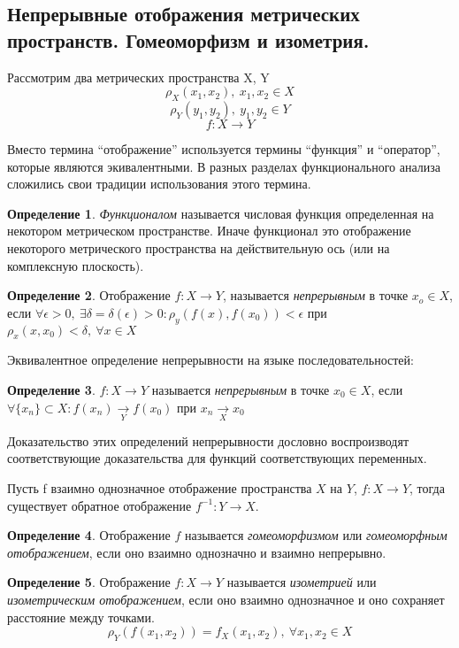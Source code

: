 \documentclass[14pt,a4paper]{extarticle}
\theoremstyle{definition}
\newtheorem{definition}{Определение}[section]
\theoremstyle{remark}
\renewcommand{\[}{\begin{dmath*}[compact]}
\renewcommand{\]}{\end{dmath*}}
\newcommand{\sep}{ , \ \allowbreak }
\begin{document}
\subsection{Непрерывные отображения метрических пространств.
Гомеоморфизм и изометрия.}

Рассмотрим два метрических пространства X, Y
\[\rho_X(x_1,x_2)\sep x_1,x_2\in X \]
\[\rho_Y(y_1, y_2)\sep y_1,y_2\in Y \]
\[ {f: X \to Y}\]

Вместо термина ``отображение'' используется термины ``функция'' и
``оператор'', которые являются экивалентными.
В разных разделах функционального анализа сложились свои традиции
использования этого термина.

\begin{definition}
  \textit{Функционалом} называется числовая функция определенная на
  некотором метрическом пространстве.
  Иначе функционал это отображение некоторого метрического
  пространства на действительную ось (или на комплексную плоскость).
\end{definition}

\begin{definition}
  Отображение $f: X \to Y$, называется \textit{непрерывным} в точке $x_o \in X$,
  если $ \forall \epsilon > 0 \sep \exists \delta = \delta (\epsilon) > 0:
  \rho_y(f(x), f(x_0)) < \epsilon$ при $\rho_x(x,x_0)<\delta \sep
  \forall x \in X$
\end{definition}

Эквивалентное определение непрерывности на языке последовательностей:
\begin{definition}
  $f: X \to Y$ называется \textit{непрерывным} в точке $x_0 \in X$, если
  $\forall \{x_n\}\subset X: f(x_n) \xrightarrow[Y]{} f(x_0)$
  при $x_n\xrightarrow[X]{} x_0$
\end{definition}

Доказательство этих определений непрерывности дословно воспроизводят
соответствующие доказательства для функций соответствующих переменных.

Пусть f взаимно однозначное отображение пространства $X$ на $Y$,
$f: X \to Y$, тогда существует обратное отображение
$f^{-1}: Y\to X$.

\begin{definition}
  Отображение $f$ называется \textit{гомеоморфизмом} или
  \textit{гомеоморфным отображением},
  если оно взаимно однозначно и взаимно непрерывно.
\end{definition}

\begin{definition}
  Отображение $f: X \to Y$ называется \textit{изометрией} или
  \textit{изометрическим отображением},
  если оно взаимно однозначное и оно сохраняет расстояние между точками.
  \[ \rho_Y(f(x_1,x_2))=f_X(x_1,x_2) \sep {\forall x_1,x_2\in X}\]
\end{definition}
\end{document}
